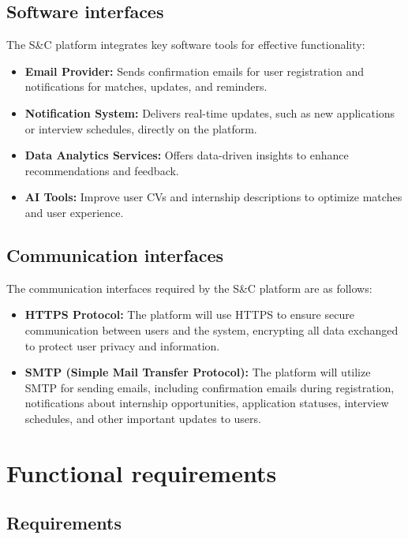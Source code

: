 \subsection{Software interfaces}
\label{subsec:software_interfaces}%


The S\&C platform integrates key software tools for effective functionality:

\begin{itemize}
\item
  \textbf{Email Provider:} Sends confirmation emails for user registration and notifications for matches, updates, and reminders.
\item
  \textbf{Notification System:} Delivers real-time updates, such as new applications or interview schedules, directly on the platform.
\item
  \textbf{Data Analytics Services:} Offers data-driven insights to enhance recommendations and feedback.
\item
  \textbf{AI Tools:} Improve user CVs and internship descriptions to optimize matches and user experience.
\end{itemize}


\subsection{Communication interfaces}
\label{subsec:communication_interfaces}%


The communication interfaces required by the S\&C platform are as
follows:

\begin{itemize}
\item
  \textbf{HTTPS Protocol:} The platform will use HTTPS to ensure secure 
  communication between users and the system, encrypting all data 
  exchanged to protect user privacy and information.
\item
  \textbf{SMTP (Simple Mail Transfer Protocol):} The platform will utilize SMTP for sending emails, including confirmation emails during registration, notifications about internship opportunities, application statuses, 
  interview schedules, and other important updates to users.
\end{itemize}


\section{Functional requirements}
\label{sec:functional_requirements}%


\subsection{Requirements}
\label{subsec:requirements}%


